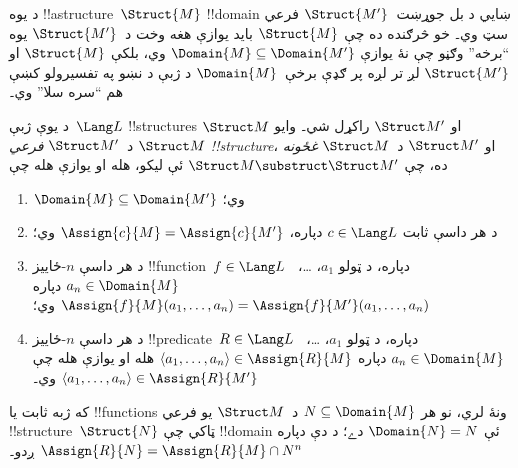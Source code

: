\documentclass[../../../include/open-logic-section]{subfiles}
\begin{document}

د يوه !!a{structure}~$\Struct{M}$ !!{domain} ښايي د بل
جوړښت~$\Struct{M'}$ فرعي سټ وي۔ خو څرګنده ده چې $\Struct{M}$ بايد
يوازې هغه وخت د~$\Struct{M'}$ يوه ``برخه'' وګڼو چې نۀ يوازې
$\Domain{M} \subseteq \Domain{M'}$ وي، بلکې $\Struct{M}$ او
$\Struct{M'}$ لږ تر لږه پر ګډې برخې~$\Domain{M}$ د ژبې د نښو په
تفسيرولو کښې هم ``سره سلا'' وي۔

\begin{defn}
د يوې ژبې~$\Lang L$ !!{structure}s $\Struct M$ او $\Struct M'$ راکړل شي۔
وايو $\Struct M$ د~$\Struct M'$ \emph{فرعي !!{structure}}، او
$\Struct M'$ د~$\Struct M$ \emph{غځونه} ده، چې
$\Struct M \substruct \Struct M'$ ئې ليکو، هله او يوازې هله چې
\begin{enumerate}
\item $\Domain{M} \subseteq \Domain{M'}$ وي؛
\item د هر داسې ثابت $c \in \Lang L$ دپاره، $\Assign{c}{M} =
    \Assign{c}{M'}$ وي؛
\item د هر داسې $n$-ځاييز !!{function}~$f \in \Lang L$ دپاره، د
  ټولو $a_1$، \dots،~$a_n \in \Domain{M}$ دپاره
  $\Assign{f}{M}(a_1, \dots, a_n) = \Assign{f}{M'}(a_1, \dots, a_n)$
  وي؛
\item د هر داسې $n$-ځاييز !!{predicate}~$R \in \Lang L$ دپاره، د
  ټولو $a_1$، \dots،~$a_n \in \Domain{M}$ دپاره
  $\langle a_1, \dots, a_n\rangle \in \Assign{R}{M}$ هله او يوازې
  هله چې $\langle a_1, \dots, a_n\rangle \in \Assign{R}{M'}$ وي۔
\end{enumerate}
\end{defn}

\begin{rem}
که ژبه ثابت يا !!{function}s ونۀ لري، نو هر
$N \subseteq \Domain{M}$ د~$\Struct M$ يو فرعي
!!{structure}~$\Struct{N}$ ټاکي چې !!{domain} ئې
$\Domain{N} = N$ دے؛ د دې دپاره $\Assign{R}{N} =
\Assign{R}{M} \cap N^n$ ږدو۔
\end{rem}

\end{document}
